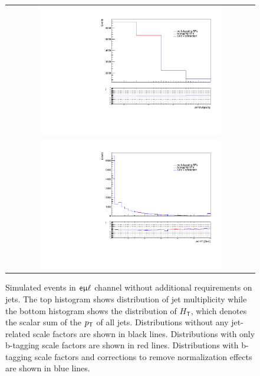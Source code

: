  \begin{figure}[tbh!]
 \begin{center}
 \begin{tabular}{c}
 \includegraphics[width=0.75\textwidth]{figures/Part3/Objects/njet_Btag}\\
 \includegraphics[width=0.75\textwidth]{figures/Part3/Objects/Ht_Btag} \\
 \end{tabular}
 \caption{Simulated events in $\textsf{e}\upmu\ell$ channel without additional requirements on jets. The top histogram shows distribution of jet multiplicity while the bottom histogram shows the distribution of $H_\textsf{T}$, which denotes the scalar sum of the $p_{\textsf{T}}$ of all jets. Distributions without any jet-related scale factors are shown in black lines. Distributions with only b-tagging scale factors are shown in red lines. Distributions with b-tagging scale factors and corrections to remove normalization effects are shown in blue lines.}
 \label{fig:BtagSF}
 \end{center}
\end{figure}